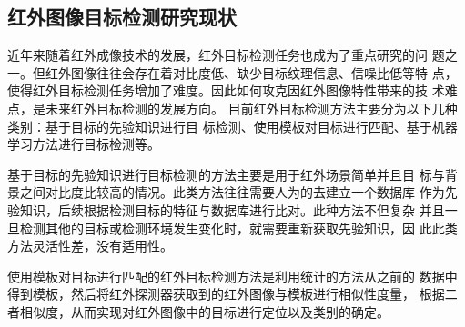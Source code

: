 \subsection{红外图像目标检测研究现状}
近年来随着红外成像技术的发展，红外目标检测任务也成为了重点研究的问
题之一。但红外图像往往会存在着对比度低、缺少目标纹理信息、信噪比低等特
点，使得红外目标检测任务增加了难度。因此如何攻克因红外图像特性带来的技
术难点，是未来红外目标检测的发展方向。
目前红外目标检测方法主要分为以下几种类别：基于目标的先验知识进行目
标检测、使用模板对目标进行匹配、基于机器学习方法进行目标检测等。

基于目标的先验知识进行目标检测的方法主要是用于红外场景简单并且目
标与背景之间对比度比较高的情况。此类方法往往需要人为的去建立一个数据库
作为先验知识，后续根据检测目标的特征与数据库进行比对。此种方法不但复杂
并且一旦检测其他的目标或检测环境发生变化时，就需要重新获取先验知识，因
此此类方法灵活性差，没有适用性。

使用模板对目标进行匹配的红外目标检测方法是利用统计的方法从之前的
数据中得到模板，然后将红外探测器获取到的红外图像与模板进行相似性度量，
根据二者相似度，从而实现对红外图像中的目标进行定位以及类别的确定\cite{宋曦2010一种基于模板匹配的目标识别方法}。

